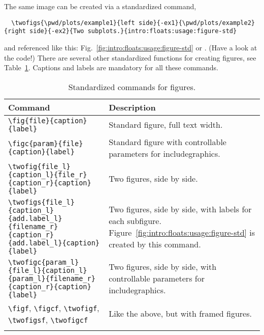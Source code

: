 \noindent The same image can be created via a standardized command,
{\tiny\begin{verbatim}
  \twofigs{\pwd/plots/example1}{left side}{-ex1}{\pwd/plots/example2}{right side}{-ex2}{Two subplots.}{intro:floats:usage:figure-std}
\end{verbatim}}
\noindent and referenced like this: Fig.~\ref{fig:intro:floats:usage:figure-std} or . (Have a look at the code!) There are several other standardized functions for creating figures, see Table~\ref{tab:intro:floats:figures}. Captions and labels are mandatory for all these commands.
\begin{longtable}{>{\tiny}l|>{\tiny}p{}}
  \normalsize\textbf{Command} & \normalsize\textbf{Description} \\\hline
  \verb|\fig{file}{caption}{label}| & Standard figure, full text width. \\\hline
  \verb|\figc{param}{file}{caption}{label}| & Standard figure with controllable parameters for includegraphics. \\\hline
  \verb|\twofig{file_l}{caption_l}{file_r}{caption_r}{caption}{label}| & Two figures, side by side. \\\hline
  \verb|\twofigs{file_l}{caption_l}{add.label_l}{filename_r}{caption_r}{add.label_l}{caption}{label}| & Two figures, side by side, with labels for each subfigure. Figure~\ref{fig:intro:floats:usage:figure-std} is created by this command.\\\hline
  \verb|\twofigc{param_l}{file_l}{caption_l}{param_l}{filename_r}{caption_r}{caption}{label}| & Two figures, side by side, with controllable parameters for includegraphics. \\\hline
  \verb|\figf|, \verb|\figcf|, \verb|\twofigf|, \verb|\twofigsf|, \verb|\twofigcf| & Like the above, but with framed figures. \\
  \caption{Standardized commands for figures.}
  \label{tab:intro:floats:figures}
\end{longtable}





